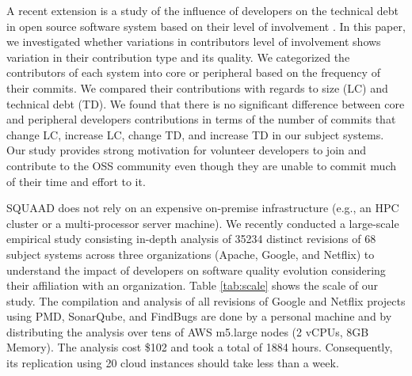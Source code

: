 A recent extension is a study of the influence of developers on the technical debt in open source software system based on their level of involvement \cite{10.1007/978-3-319-62217-0_9}. In this paper, we investigated whether variations in contributors level of involvement shows variation in their contribution type and its quality. We categorized the contributors of each system into core or peripheral based on the frequency of their commits. We compared their contributions with regards to size (LC) and technical debt (TD). We found that there is no significant difference between core and peripheral developers contributions in terms of the number of commits that change LC, increase LC, change TD, and increase TD in our subject systems. Our study provides strong motivation for volunteer developers to join and contribute to the OSS community even though they are unable to commit much of their time and effort to it.

SQUAAD does not rely on an expensive on-premise infrastructure (e.g., an HPC cluster or a multi-processor server machine). 
We recently conducted a large-scale empirical study consisting in-depth analysis of 35234 distinct revisions of 68 subject systems across three organizations (Apache, Google, and Netflix) to understand the impact of developers on software quality evolution considering their affiliation with an organization.
Table \ref{tab:scale} shows the scale of our study.
The compilation and analysis of all revisions of Google and Netflix projects using PMD, SonarQube, and FindBugs are done by a personal machine and by distributing the analysis over tens of AWS m5.large nodes (2 vCPUs, 8GB Memory). 
The analysis cost \$102 and took a total of 1884 hours. 
Consequently, its replication using 20 cloud instances should take less than a week.

\begin{table}[htbp]
	\centering
	\caption{A Recent Experiment's Scale}
	\label{tab:scale}%
	\vspace{-0.3cm}
\end{table}%


